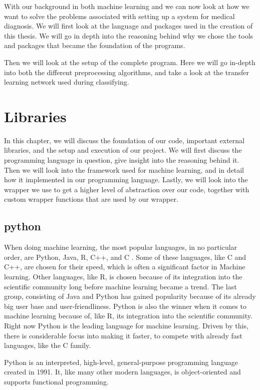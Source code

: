 With our background in both machine learning and  we can now look at how we want to solve the problems associated with setting up a system for medical diagnosis.  
We will first look at the language and packages used in the creation of this thesis. We will go in depth into the reasoning behind why we chose the tools and packages that became the foundation of the programs. 

Then we will look at the setup of the complete program. Here we will go in-depth into both the different preprocessing algorithms, and take a look at the transfer learning network used during classifying.


\section{Libraries} 
In this chapter, we will discuss the foundation of our code, important external libraries, and the setup and execution of our project.  
We will first discuss the programming language in question, give insight into the reasoning behind it. Then we will look into the framework used for machine learning, and in detail how it implemented in our programming language. Lastly, we will look into the wrapper we use to get a higher level of abstraction over our code, together with custom wrapper functions that are used by our wrapper. 

\subsection{python}
When doing machine learning, the most popular languages, in no particular order, are Python, Java, R, C++, and C . Some of these languages, like C and C++, are chosen for their speed, which is often a significant factor in Machine learning. Other languages, like R, is chosen because of its integration into the scientific community long before machine learning became a trend. The last group, consisting of Java and Python has gained popularity because of its already big user base and user-friendliness. Python is also the winner when it comes to machine learning because of, like R, its integration into the scientific community. 
Right now Python is the leading language for machine learning. Driven by this, there is considerable focus into making it faster, to compete with already fast languages, like the C family. 

Python is an interpreted, high-level, general-purpose programming language created in 1991.   It, like many other modern languages, is object-oriented and supports functional programming. 

